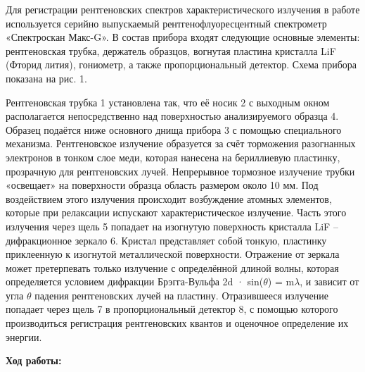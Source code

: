 \documentclass[a4paper, 12pt]{article}%
\begin{document}
	Для регистрации рентгеновских спектров характеристического излучения в работе используется серийно выпускаемый рентгенофлуоресцентный спектрометр «Спектроскан Макс-G». В состав прибора входят следующие основные элементы: рентгеновская трубка, держатель образцов,
	вогнутая пластина кристалла LiF (Фторид лития), гониометр, а также пропорциональный детектор. Схема прибора показана на рис. 1.
	



	
	Рентгеновская трубка 1
	установлена так, что её носик 2 с выходным окном располагается непосредственно над поверхностью анализируемого образца 4. Образец подаётся ниже основного днища прибора 3 с помощью специального механизма. Рентгеновское излучение образуется за счёт торможения разогнанных электронов в тонком слое меди, которая нанесена на бериллиевую пластинку, прозрачную для рентгеновских лучей. Непрерывное
	тормозное излучение трубки «освещает» на поверхности образца область размером около 10 мм. Под воздействием этого излучения происходит возбуждение атомных элементов, которые при релаксации испускают характеристическое излучение. Часть этого излучения через щель 5 попадает на изогнутую поверхность кристалла LiF – дифракционное
	зеркало 6. Кристал представляет собой тонкую, пластинку приклеенную
	к изогнутой металлической поверхности. Отражение от зеркала может
	претерпевать только излучение с определённой длиной волны, которая
	определяется условием дифракции Брэгга-Вульфа 2d · sin($\theta$) = m$\lambda$, и зависит от угла $\theta$
	падения рентгеновских лучей на пластину. Отразившееся излучение попадает через щель 7 в пропорциональный детектор 8, с помощью которого производиться регистрация рентгеновских квантов и оценочное
	определение их энергии.
	
	
	\newpage
	
	\textbf{Ход работы: }\\
	
\end{document}
